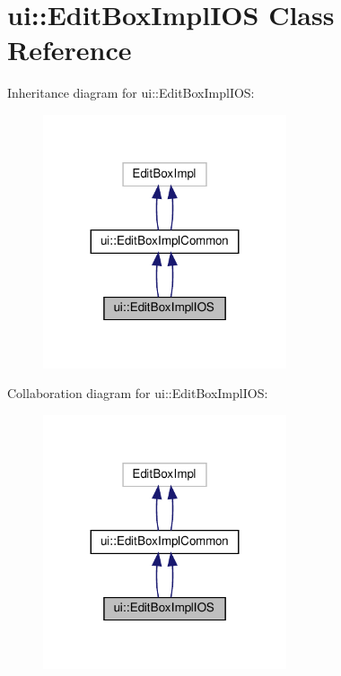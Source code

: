 \hypertarget{classui_1_1EditBoxImplIOS}{}\section{ui\+:\+:Edit\+Box\+Impl\+I\+OS Class Reference}
\label{classui_1_1EditBoxImplIOS}


Inheritance diagram for ui\+:\+:Edit\+Box\+Impl\+I\+OS\+:
\nopagebreak
\begin{figure}[H]
\begin{center}
\leavevmode
\includegraphics[width=203pt]{classui_1_1EditBoxImplIOS__inherit__graph}
\end{center}
\end{figure}


Collaboration diagram for ui\+:\+:Edit\+Box\+Impl\+I\+OS\+:
\nopagebreak
\begin{figure}[H]
\begin{center}
\leavevmode
\includegraphics[width=203pt]{classui_1_1EditBoxImplIOS__coll__graph}
\end{center}
\end{figure}
